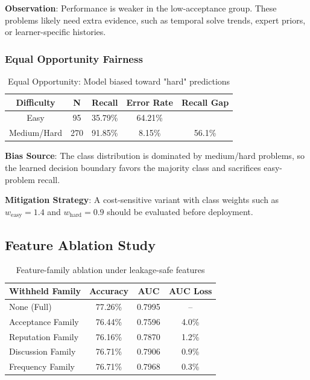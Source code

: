 \documentclass[conference]{IEEEtran}
\begin{document}
\textbf{Observation}: Performance is weaker in the low-acceptance group. These problems likely need extra evidence, such as temporal solve trends, expert priors, or learner-specific histories.

\subsubsection{Equal Opportunity Fairness}

\begin{table}[h]
\centering
\small
\begin{tabular}{c|c|c|c|c}
\toprule
\textbf{Difficulty} & \textbf{N} & \textbf{Recall} & \textbf{Error Rate} & \textbf{Recall Gap} \\
\midrule
Easy & 95 & 35.79\% & 64.21\% & \\
Medium/Hard & 270 & 91.85\% & 8.15\% & 56.1\% \\
\bottomrule
\end{tabular}
\caption{Equal Opportunity: Model biased toward "hard" predictions}
\label{tab:fairness}
\end{table}

\textbf{Bias Source}: The class distribution is dominated by medium/hard problems, so the learned decision boundary favors the majority class and sacrifices easy-problem recall.

\textbf{Mitigation Strategy}: A cost-sensitive variant with class weights such as $w_{\text{easy}} = 1.4$ and $w_{\text{hard}} = 0.9$ should be evaluated before deployment.

\subsection{Feature Ablation Study}
\label{sec:ablation}

\begin{table}[h]
\centering
\small
\begin{tabular}{l|c|c|c}
\toprule
\textbf{Withheld Family} & \textbf{Accuracy} & \textbf{AUC} & \textbf{AUC Loss} \\
\midrule
None (Full) & 77.26\% & 0.7995 & -- \\
Acceptance Family & 76.44\% & 0.7596 & 4.0\% \\
Reputation Family & 76.16\% & 0.7870 & 1.2\% \\
Discussion Family & 76.71\% & 0.7906 & 0.9\% \\
Frequency Family & 76.71\% & 0.7968 & 0.3\% \\
\bottomrule
\end{tabular}
\caption{Feature-family ablation under leakage-safe features}
\label{tab:ablation}
\end{table}
\end{document}
